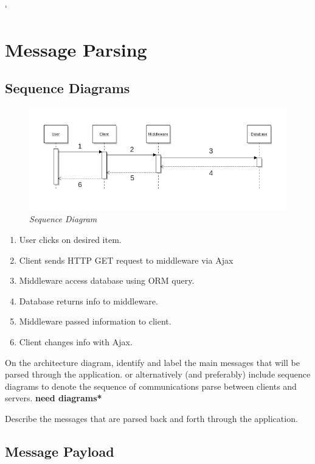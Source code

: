`\documentclass{sig-alt-release2}
\begin{document}
\section{Message Parsing}

\subsection{Sequence Diagrams}

\begin{figure}[!htbp]
  \caption{\textit{Sequence Diagram}}
  \begin{center}
		\includegraphics[scale=0.35]{img/sequencelabel.png}
  \end{center}
\end{figure}

\begin{enumerate}
\item User clicks on desired item.
\item Client sends HTTP GET request to middleware via Ajax
\item Middleware access database using ORM query.
\item Database returns info to middleware.
\item Middleware passed information to client.
\item Client changes info with Ajax.
\end{enumerate}

On the architecture diagram, identify and label the main messages that will be parsed through the application.
or alternatively (and preferably) include sequence diagrams to denote the sequence of communications parse between clients and servers. {\bf *need diagrams*} 

Describe the messages that are parsed back and forth through the application.

\subsection{Message Payload}
\end{document}
